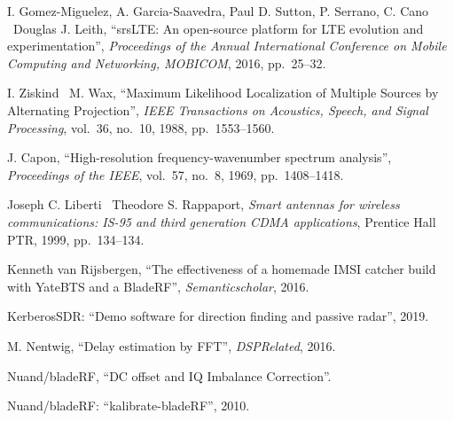 \documentclass[a4paper,12pt,oneside]{book}%
\begin{document}
\begin{thebibliography}{xx}
	I. Gomez-Miguelez, A. Garcia-Saavedra, Paul D. Sutton, P. Serrano, C. Cano
	\harvardand\ Douglas J. Leith,
	``{srsLTE: An open-source platform for LTE evolution and experimentation}'',
	{\em Proceedings of the Annual International Conference on Mobile Computing
		and Networking, MOBICOM}, 2016, pp.~25--32.
	
	I. Ziskind \harvardand\ M. Wax,
	``{Maximum Likelihood Localization of Multiple Sources by Alternating
		Projection}'', {\em IEEE Transactions on Acoustics, Speech, and Signal
		Processing}, {vol.~36}, no.~10, 1988, pp.~1553--1560.
	
	J. Capon, ``{High-resolution frequency-wavenumber spectrum analysis}'', 
	{\em Proceedings of the IEEE}, {vol.~57}, no.~8, 1969, pp.~1408--1418.
	
	Joseph C. Liberti \harvardand\ Theodore S. Rappaport, {\em Smart antennas for wireless communications: IS-95 and third generation CDMA applications}, 
	{Prentice Hall PTR}, 1999, pp.~134--134.
	
	Kenneth van Rijsbergen, ``{The
		effectiveness of a homemade IMSI catcher build with YateBTS and a BladeRF}'', {\em Semanticscholar}, 2016.
	
	{KerberosSDR: ``Demo software for direction finding and passive radar''}, 2019.
	
	M. Nentwig, ``{Delay estimation by FFT}'', {\em DSPRelated}, 2016.
	
	{ {Nuand/bladeRF, ``DC offset and IQ Imbalance Correction''.}} 
	
	{Nuand/bladeRF: ``kalibrate-bladeRF''}, 2010.
	

\end{thebibliography}
\end{document}
